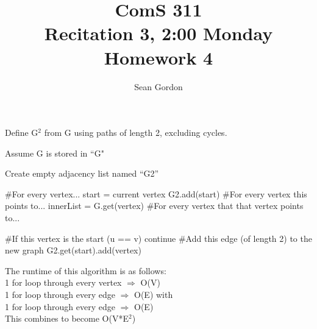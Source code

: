 \documentclass[12pt]{article}
\title{ComS 311\\Recitation 3, 2:00 Monday\\Homework 4}
\author{Sean Gordon}
\begin{document}
\maketitle


\begin{algorithm}[H]
\caption{Define G$^2$ from G using paths of length 2, excluding cycles.}
\begin{algorithmic}
\State Assume G is stored in ``G"

\State
\State Create empty adjacency list named ``G2''
\State

\State \#For every vertex...
\State start = current vertex
\State G2.add(start)
\State
\State \#For every vertex this points to...
\State innerList = G.get(vertex)
\State
\State \#For every vertex that that vertex points to...

\State
\State \#If this vertex is the start (u == v)
\State continue
\EndIf
\State
\State \#Add this edge (of length 2) to the new graph
\State G2.get(start).add(vertex)

\EndFor
\EndFor
\EndFor
\State
\end{algorithmic}
\end{algorithm}
\noindent The runtime of this algorithm is as follows:\\
1 for loop through every vertex $\Rightarrow$ O(V)\\
1 for loop through every edge $\Rightarrow$ O(E) with\\
1 for loop through every edge $\Rightarrow$ O(E)\\
This combines to become O(V*E$^2$)





\pagebreak
\end{document}
